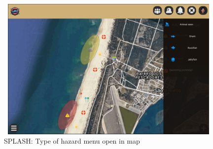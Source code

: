 \begin{figure}[H]
      \centering
      \includegraphics[width=13cm,height=7cm]{figs/Mockups/MAP_add2.png}
      \caption{SPLASH: Type of hazard menu open in map}
      \label{fig:Login}
\end{figure}